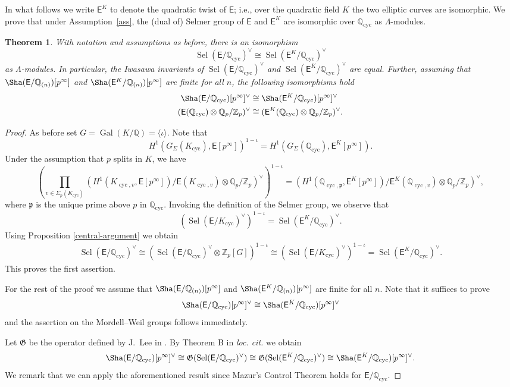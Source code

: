 \documentclass{amsart}
\newtheorem{theorem}{Theorem}[section]
\numberwithin{equation}{section}
\theoremstyle{remark}
\newcommand{\Gal}{\operatorname{Gal}}
\newcommand{\cyc}{\operatorname{cyc}}
\newcommand{\Sel}{\operatorname{Sel}}
\newcommand{\Z}{\mathbb{Z}}
\newcommand{\Qp}{\mathbb{Q}_p}
\newcommand{\Q}{\mathbb{Q}}
\newcommand{\EC}{\mathsf{E}}
\newcommand{\fp}{\mathfrak{p}}
\theoremstyle{plain} %
\begin{document}
In what follows we write $\EC^K$ to denote the quadratic twist of $\EC$; i.e.,  over the quadratic field $K$ the two elliptic curves are isomorphic.
We prove that under Assumption~\ref{ass}, the (dual of) Selmer group of $\EC$ and $\EC^K$ are isomorphic over $\Q_{\cyc}$ as $\Lambda$-modules.


\begin{theorem}
\label{thm:expl-twist}
With notation and assumptions as before, there is an isomorphism
\[
\Sel(\EC/\Q_{\cyc})^\vee\cong \Sel(\EC^K/\Q_{\cyc})^\vee
\]
as $\Lambda$-modules.
{In particular, the Iwasawa invariants of $\Sel(\EC/\Q_{\cyc})^\vee$ and $\Sel(\EC^K/\Q_{\cyc})^\vee$ are equal.}
Further, assuming that  $\Sha(\EC/\Q_{(n)})[p^\infty]$ and $\Sha(\EC^K/\Q_{(n)})[p^\infty]$ are finite for all $n$, the following isomorphisms hold
\begin{align*}
\Sha(\EC/\Q_{\cyc})[p^\infty]^\vee &\cong\Sha(\EC^K/\Q_{\cyc})[p^\infty]^\vee \\
(\EC(\Q_{\cyc})\otimes \Qp/\Z_p)^\vee&\cong (\EC^K(\Q_{\cyc})\otimes \Qp/\Z_p)^\vee.
\end{align*}
\end{theorem}

\begin{proof}
As before set $G=\Gal(K/\Q) = \langle \iota\rangle$.
Note that 
\[H^1(G_\Sigma(K_{\cyc}),\EC[p^\infty])^{1-\iota}=H^1(G_\Sigma(\Q_{\cyc}),\EC^K[p^\infty]).\]
Under the assumption that $p$ splits in $K$, we have 
\[
\left(\prod_{v\in \Sigma_p(K_{\cyc})}\left(H^1(K_{\cyc,v},\EC[p^\infty])/\EC(K_{\cyc,v})\otimes \Qp/\Z_p\right)^\vee\right)^{1-\iota}=\left(H^1(\Q_{\cyc,\fp},\EC^K[p^\infty])/\EC^K(\Q_{\cyc,v})\otimes \Qp/\Z_p\right)^\vee ,
\]
where $\fp$ is the unique prime above $p$ in $\Q_{\cyc}$.
Invoking the definition of the Selmer group, we observe that
\[
\left(\Sel(\EC/K_{\cyc})^\vee\right)^{1-\iota}=\Sel(\EC^K/\Q_{\cyc})^\vee.
\]
Using Proposition \ref{central-argument} we obtain
\begin{align*}
\Sel(\EC/\Q_{\cyc})^\vee\cong\left(\Sel(\EC/\Q_{\cyc})^\vee\otimes \Z_p[G]\right)^{1-\iota}\cong \left(\Sel(\EC/K_{\cyc})^\vee\right)^{1-\iota}=\Sel(\EC^K/\Q_{\cyc})^\vee.
\end{align*}
This proves the first assertion.

For the rest of the proof we assume that $\Sha(\EC/\Q_{(n)})[p^\infty]$ and $\Sha(\EC^K/\Q_{(n)})[p^\infty]$ are finite for all $n$.
Note that it suffices to prove 
\[
\Sha(\EC/\Q_{\cyc})[p^\infty]^\vee \cong \Sha(\EC^K/\Q_{\cyc})[p^\infty]
^\vee
\]
and the assertion on the Mordell--Weil groups follows immediately.

Let $\mathfrak{G}$ be the operator defined by J.~Lee in \cite{Lee20}.
By Theorem B in \emph{loc. cit.} we obtain
\[
\Sha(\EC/\Q_{\cyc})[p^\infty]^\vee\cong \mathfrak{G}(\Sel(\EC/\Q_{\cyc})^\vee) \cong \mathfrak{G}(\Sel(\EC^K/\Q_{\cyc})^\vee)\cong \Sha(\EC^K/\Q_{\cyc})[p^\infty]^\vee.
\]
We remark that we can apply the aforementioned result since Mazur's Control Theorem holds for $\EC/\Q_{\cyc}$.
\end{proof}
\end{document}
